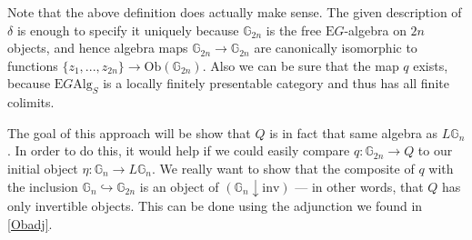 Note that the above definition does actually make sense. The given description of $\delta$ is enough to specify it uniquely because $\mathbb{G}_{2n}$ is the free $\mathrm{E}G$-algebra on $2n$ objects, and hence algebra maps $\mathbb{G}_{2n} \to \mathbb{G}_{2n}$ are canonically isomorphic to functions $\{z_1, ..., z_{2n}\} \to \mathrm{Ob}(\mathbb{G}_{2n})$. Also we can be sure that the map $q$ exists, because $\mathrm{E}G\mathrm{Alg}_S$ is a locally finitely presentable category and thus has all finite colimits.

The goal of this approach will be show that $Q$ is in fact that same algebra as $L\mathbb{G}_n$. In order to do this, it would help if we could easily compare $q: \mathbb{G}_{2n} \to Q$ to our initial object $\eta: \mathbb{G}_{n} \to L\mathbb{G}_n$. We really want to show that the composite of $q$ with the inclusion $\mathbb{G}_n \hookrightarrow \mathbb{G}_{2n}$ is an object of $(\mathbb{G}_n \downarrow \mathrm{inv})$ --- in other words, that $Q$ has only invertible objects. This can be done using the adjunction we found in \cref{Obadj}.

